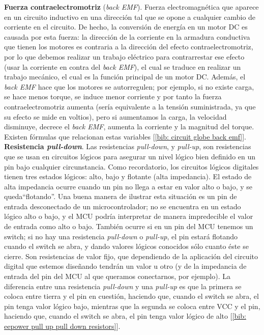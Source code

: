 \documentclass[12pt]{article}
\begin{document}
	\noindent \textbf{\large Fuerza contraelectromotriz} (\textit{back EMF}). Fuerza electromagnética que aparece en un circuito inductivo en una dirección tal que se opone a cualquier cambio de corriente en el circuito. De hecho, la conversión de energía en un motor DC es causada por esta fuerza: la dirección de la corriente en la armadura conductiva que tienen los motores es contraria a la dirección del efecto contraelectromotriz, por lo que debemos realizar un trabajo eléctrico para contrarrestar ese efecto (usar la corriente en contra del \textit{back EMF}), el cual se traduce en realizar un trabajo mecánico, el cual es la función principal de un motor DC. Además, el \textit{back EMF} hace que los motores se autorregulen; por ejemplo, si no existe carga, se hace menos torque, se induce menor corriente y por tanto la fuerza contraelectromotriz aumenta (sería equivalente a la tensión suministrada, ya que su efecto se mide en voltios), pero si aumentamos la carga, la velocidad disminuye, decrece el \textit{back EMF}, aumenta la corriente y la magnitud del torque. Existen fórmulas que relacionan estas variables [\ref{bib: circuit globe back emf}].\\
	
	\noindent \textbf{\large Resistencia \textit{pull-down}}. Las resistencias \textit{pull-down}, y \textit{pull-up}, son resistencias que se usan en circuitos lógicos para asegurar un nivel lógico bien definido en un pin bajo cualquier circunstancia. Como recordatorio, los circuitos lógicos digitales tienen tres estados lógicos: alto, bajo y flotante (alta impedancia). El estado de alta impedancia ocurre cuando un pin no llega a estar en valor alto o bajo, y se queda``flotando''. Una buena manera de ilustrar esta situación es un pin de entrada desconectado de un microcontrolador; no se encuentra en un estado lógico alto o bajo, y el MCU podría interpretar de manera impredecible el valor de entrada como alto o bajo. También ocurre si en un pin del MCU tenemos un switch; si no hay una resistencia \textit{pull-down} o \textit{pull-up}, el pin estará flotando cuando el switch se abra, y dando valores lógicos conocidos sólo cuanto éste se cierre. Son resistencias de valor fijo, que dependiendo de la aplicación del circuito digital que estemos diseñando tendrán un valor u otro (y de la impedancia de entrada del pin del MCU al que queramos conectarnos, por ejemplo). La diferencia entre una resistencia \textit{pull-down} y una \textit{pull-up} es que la primera se coloca entre tierra y el pin en cuestión, haciendo que, cuando el switch se abra, el pin tenga valor lógico bajo, mientras que la segunda se coloca entre VCC y el pin, haciendo que, cuando el switch se abra, el pin tenga valor lógico de alto [\ref{bib: eepower pull up pull down resistors}].\\ 
	
\end{document}
